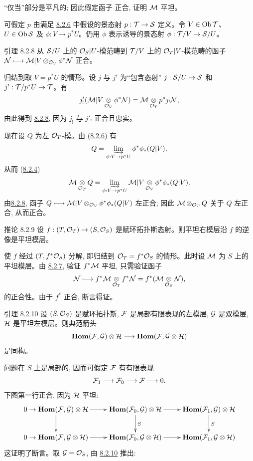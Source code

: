 “仅当”部分是平凡的; 因此假定函子  正合, 证明 ${\mathcal M}$ 平坦。

可假定 $p$ 由满足 \hyperref[V.prop8.2.6]{8.2.6} 中假设的景态射 $p:\Tt\to\Ss$ 定义。令 $V\in\operatorname{Ob}{\mathcal T}$、$U\in\operatorname{Ob}{\mathcal S}$ 及 $\phi:V\to p^{\ast}U$。仍用 $\phi$ 表示诱导的景态射 $\phi:\Tt/V\to\Ss/U$。

\begin{enonce*}{引理 8.2.8}
从 ${\mathcal S}/U$ 上的 ${\mathcal O}_S|U$-模范畴到 ${\mathcal T}/V$ 上的 ${\mathcal O}_T|V$-模范畴的函子
${\mathcal N}\longmapsto{\mathcal M}|V\mathop{\otimes}_{{\mathcal O}_V}\phi^{\ast}{\mathcal N}$
正合。
\end{enonce*}

归结到取 $V=p^{\ast}U$ 的情形。设 $j$ 与 $j'$ 为“包含态射” $j:\Ss/U\to\Ss$ 和 $j':\Tt/p^{\ast}U\to\Tt$。有
$$
j'_!({\mathcal M}|V\mathop{\otimes}_{{\mathcal O}_V}\phi^{\ast}{\mathcal N})
={\mathcal M}\mathop{\otimes}_{{\mathcal O}_T}p^{\ast}j_!{\mathcal N}{},
$$
由此得到 \hyperref[V.lem8.2.8]{8.2.8}, 因为 $j_!$ 与 $j'_!$ 正合且忠实。

现在设 $Q$ 为左 ${\mathcal O}_T$-模。由 \hyperref[V.prop8.2.6]{(8.2.6)} 有
$$
Q=\varinjlim_{\phi:V\to p^{\ast}U}
\phi^{\ast}\phi_\ast(Q|V),
$$
从而 (\hyperref[V.prop8.2.4]{8.2.4})
$$
\Mm\mathop{\otimes}_{\Oo_T}Q
=\varinjlim_{\phi:V\to p^{\ast}U}
\Mm|V\mathop{\otimes}_{\Oo_V}
\phi^{\ast}\phi_\ast(Q|V){\quoi}.
$$
由\pageoriginale \hyperref[V.lem8.2.8]{8.2.8}, 函子 $Q\longmapsto{\mathcal M}|V\mathop{\otimes}_{{\mathcal O}_V}
\phi^{\ast}\phi_\ast(Q|V)$ 左正合; 因此 ${\mathcal M}\mathop{\otimes}_{{\mathcal O}_T}Q$ 关于 $Q$ 左正合, 从而正合。

\begin{enonce*}{推论 8.2.9}
设 $f:(T,\Oo_T)\to(S,\Oo_S)$ 是赋环拓扑斯态射。则平坦右模层沿 $f$ 的逆像是平坦模层。
\end{enonce*}

使 $f$ 经过 $(T,f^{\ast}{\mathcal O}_S)$ 分解, 即归结到 ${\mathcal O}_T=f^{\ast}{\mathcal O}_S$ 的情形。此时设 ${\mathcal M}$ 为 $S$ 上的平坦模层。由 \hyperref[V.prop8.2.7]{8.2.7}, 验证 $f^{\ast}{\mathcal M}$ 平坦, 只需验证函子
$$
{\mathcal N}\longmapsto f^{\ast}{\mathcal M}\mathop{\otimes}_{{\mathcal O}_T}f^{\ast}{\mathcal N}
=f^{\ast}({\mathcal M}\mathop{\otimes}_{{\mathcal O}_S}{\mathcal N}),
$$
的正合性。由于 $f^{\ast}$ 正合, 断言得证。

\begin{enonce*}{引理 8.2.10}
设 $(S,{\mathcal O}_S)$ 是赋环拓扑斯, ${\mathcal F}$ 是局部有限表现的左模层, ${\mathcal G}$ 是双模层, ${\mathcal H}$ 是平坦左模层。则典范箭头
$$
\Hhom(\Ff,\Gg)\otimes\Hh\to
\Hhom(\Ff,\Gg\otimes\Hh)
$$
是同构。
\end{enonce*}

问题在 $S$ 上是局部的, 因而可假定 ${\mathcal F}$ 有有限表现
$$
\Ff_1\to\Ff_0\to\Ff\to0{\quoi}.
$$
下图第一行正合, 因为 ${\mathcal H}$ 平坦:
\[
\xymatrix{
0 \to \Hhom(\Ff,\Gg) \otimes \Hh \ar[r] \ar[d]&
\Hhom(\Ff_0,\Gg) \otimes \Hh \ar[r]\ar[d]^{S}&
\Hhom(\Ff_1,\Gg) \otimes \Hh \ar[d]^{S}\\
0 \to \Hhom(\Ff,\Gg \otimes \Hh) \ar[r]&
\Hhom(\Ff_0,\Gg \otimes \Hh) \ar[r]&
\Hhom(\Ff_1,\Gg \otimes \Hh)
}
\]
这证明了断言。取 ${\mathcal G}={\mathcal O}_S$, 由 \hyperref[V.lem8.2.10]{8.2.10} 推出:

